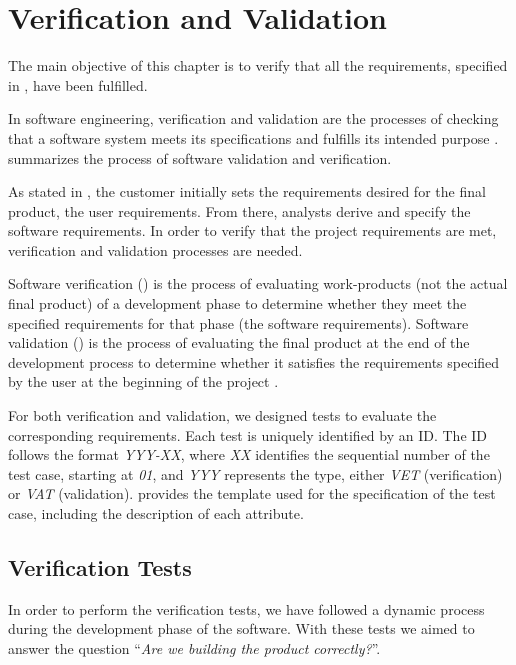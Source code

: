 \chapter{Verification and Validation}\label{chap:validation}
The main objective of this chapter is to verify that all the requirements, specified in , have been fulfilled.

In software engineering, verification and validation are the processes of checking that a software system meets its specifications and fulfills its intended purpose \parencite{IEEE1012-2012}.  summarizes the process of software validation and verification.


As stated in , the customer initially sets the requirements desired for the final product, the user requirements. From there, analysts derive and specify the software requirements. In order to verify that the project requirements are met, verification and validation processes are needed.

Software verification () is the process of evaluating work-products (not the actual final product) of a development phase to determine whether they meet the specified requirements for that phase (the software requirements). Software validation () is the process of evaluating the final product at the end of the development process to determine whether it satisfies the requirements specified by the user at the beginning of the project \parencite{IEEE1012-2012}.

For both verification and validation, we designed tests to evaluate the corresponding requirements. Each test is uniquely identified by an ID. The ID follows the format \textit{YYY-XX}, where \textit{XX} identifies the sequential number of the test case, starting at \textit{01}, and \textit{YYY} represents the type, either \textit{VET} (verification) or \textit{VAT} (validation).  provides the template used for the specification of the test case, including the description of each attribute.





\section{Verification Tests}\label{sec:verification}
In order to perform the verification tests, we have followed a dynamic process during the development phase of the software. With these tests we aimed to answer the question ``\textit{Are we building the product correctly?}''.


